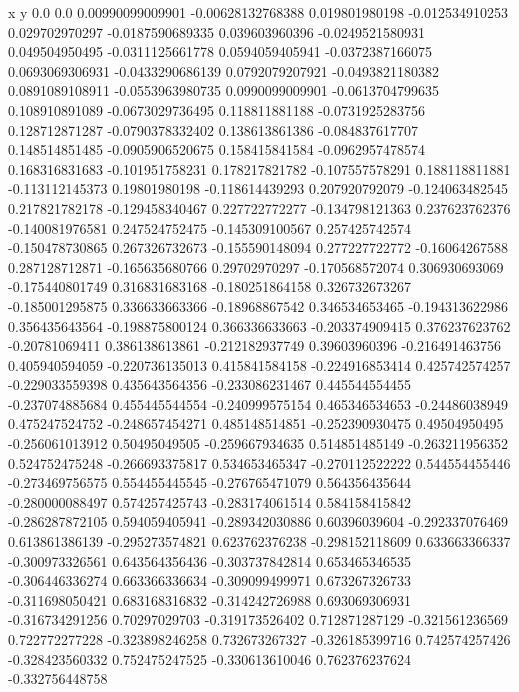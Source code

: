               x                y
            0.0              0.0
0.00990099009901  -0.00628132768388
 0.019801980198  -0.012534910253
 0.029702970297  -0.0187590689335
 0.039603960396  -0.0249521580931
 0.049504950495  -0.0311125661778
0.0594059405941  -0.0372387166075
0.0693069306931  -0.0433290686139
0.0792079207921  -0.0493821180382
0.0891089108911  -0.0553963980735
0.0990099009901  -0.0613704799635
 0.108910891089  -0.0673029736495
 0.118811881188  -0.0731925283756
 0.128712871287  -0.0790378332402
 0.138613861386  -0.084837617707
 0.148514851485  -0.0905906520675
 0.158415841584  -0.0962957478574
 0.168316831683  -0.101951758231
 0.178217821782  -0.107557578291
 0.188118811881  -0.113112145373
  0.19801980198  -0.118614439293
 0.207920792079  -0.124063482545
 0.217821782178  -0.129458340467
 0.227722772277  -0.134798121363
 0.237623762376  -0.140081976581
 0.247524752475  -0.145309100567
 0.257425742574  -0.150478730865
 0.267326732673  -0.155590148094
 0.277227722772   -0.16064267588
 0.287128712871  -0.165635680766
  0.29702970297  -0.170568572074
 0.306930693069  -0.175440801749
 0.316831683168  -0.180251864158
 0.326732673267  -0.185001295875
 0.336633663366   -0.18968867542
 0.346534653465  -0.194313622986
 0.356435643564  -0.198875800124
 0.366336633663  -0.203374909415
 0.376237623762   -0.20781069411
 0.386138613861  -0.212182937749
  0.39603960396  -0.216491463756
 0.405940594059  -0.220736135013
 0.415841584158  -0.224916853414
 0.425742574257  -0.229033559398
 0.435643564356  -0.233086231467
 0.445544554455  -0.237074885684
 0.455445544554  -0.240999575154
 0.465346534653   -0.24486038949
 0.475247524752  -0.248657454271
 0.485148514851  -0.252390930475
  0.49504950495  -0.256061013912
  0.50495049505  -0.259667934635
 0.514851485149  -0.263211956352
 0.524752475248  -0.266693375817
 0.534653465347  -0.270112522222
 0.544554455446  -0.273469756575
 0.554455445545  -0.276765471079
 0.564356435644  -0.280000088497
 0.574257425743  -0.283174061514
 0.584158415842  -0.286287872105
 0.594059405941  -0.289342030886
  0.60396039604  -0.292337076469
 0.613861386139  -0.295273574821
 0.623762376238  -0.298152118609
 0.633663366337  -0.300973326561
 0.643564356436  -0.303737842814
 0.653465346535  -0.306446336274
 0.663366336634  -0.309099499971
 0.673267326733  -0.311698050421
 0.683168316832  -0.314242726988
 0.693069306931  -0.316734291256
  0.70297029703  -0.319173526402
 0.712871287129  -0.321561236569
 0.722772277228  -0.323898246258
 0.732673267327  -0.326185399716
 0.742574257426  -0.328423560332
 0.752475247525  -0.330613610046
 0.762376237624  -0.332756448758
